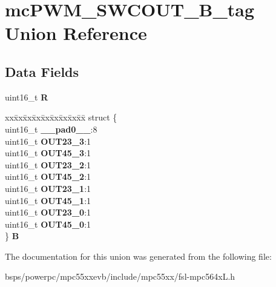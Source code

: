 \hypertarget{unionmcPWM__SWCOUT__16B__tag}{}\section{mc\+P\+W\+M\+\_\+\+S\+W\+C\+O\+U\+T\+\_\+B\+\_\+tag Union Reference}
\label{unionmcPWM__SWCOUT__16B__tag}
\subsection*{Data Fields}
\begin{DoxyCompactItemize}
\item 
\mbox{\label{unionmcPWM__SWCOUT__16B__tag_a2f17e4a351172bdb72b1e59974c6a2e6}} 
uint16\+\_\+t {\bfseries R}
\item 
\mbox{\label{unionmcPWM__SWCOUT__16B__tag_adeab5c8906da049214680e34149083b1}} 
\begin{tabbing}
xx\=xx\=xx\=xx\=xx\=xx\=xx\=xx\=xx\=\kill
struct \{\\
\>uint16\_t {\bfseries \_\_pad0\_\_}:8\\
\>uint16\_t {\bfseries OUT23\_3}:1\\
\>uint16\_t {\bfseries OUT45\_3}:1\\
\>uint16\_t {\bfseries OUT23\_2}:1\\
\>uint16\_t {\bfseries OUT45\_2}:1\\
\>uint16\_t {\bfseries OUT23\_1}:1\\
\>uint16\_t {\bfseries OUT45\_1}:1\\
\>uint16\_t {\bfseries OUT23\_0}:1\\
\>uint16\_t {\bfseries OUT45\_0}:1\\
\} {\bfseries B}\\

\end{tabbing}\end{DoxyCompactItemize}


The documentation for this union was generated from the following file\+:\begin{DoxyCompactItemize}
\item 
bsps/powerpc/mpc55xxevb/include/mpc55xx/fsl-\/mpc564x\+L.\+h\end{DoxyCompactItemize}
